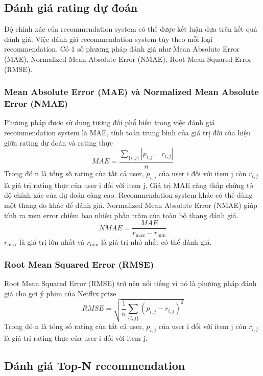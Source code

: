 \subsection{Đánh giá rating dự đoán}
Độ chính xác của recommendation system có thể được kết luận dựa trên kết quả đánh giá. Việc đánh giá recommendation system tùy theo mỗi loại recommendation. Có 1 số phương pháp đánh giá như Mean Absolute Error (MAE), Normalized Mean Absolute Error (NMAE), Root Mean Squared Error (RMSE).

\subsubsection{Mean Absolute Error (MAE) và Normalized Mean Absolute Error (NMAE)}
Phương pháp được sử dụng tương đối phổ biến trong việc đánh giá recommendation system là MAE, tính toán trung bình của giá trị đối của hiệu giữa rating dự đoán và rating thực
\begin{equation}
    MAE = \frac{\sum_{\{i,j\}} |p_{i,j} - r_{i,j}|}{n}
\end{equation}
Trong đó n là tổng số rating của tất cả user, $p_{i,j}$ của user i đối với item j còn $r_{i,j}$ là giá trị rating thực của user i đối với item j. Giá trị MAE càng thấp chứng tỏ độ chính xác của dự đoán càng cao.
\newline Recommendation system khác có thể dùng một thang đo khác để đánh giá. Normalized Mean Absolute Error (NMAE) giúp tính ra xem error chiếm bao nhiêu phần trăm của toàn bộ thang đánh giá.
\begin{equation}
    NMAE = \frac{MAE}{r_{\max} - r_{\min}}
\end{equation}
$r_{\max}$ là giá trị lớn nhất và $r_{\min}$ là giá trị nhỏ nhất có thể đánh giá.

\subsubsection{Root Mean Squared Error (RMSE)}
Root Mean Squared Error (RMSE) trở nên nổi tiếng vì nó là phương pháp đánh giá cho gợi ý phim của Netflix prize
\begin{equation}
    RMSE = \sqrt{\frac{1}{n} \underset{\{i,j\}}{\sum}(p_{i,j} - r_{i,j})^2}
\end{equation}
Trong đó n là tổng số rating của tất cả user, $p_{i,j}$ của user i đối với item j còn $r_{i,j}$ là giá trị rating thực của user i đối với item j. 

\subsection{Đánh giá Top-N recommendation}
